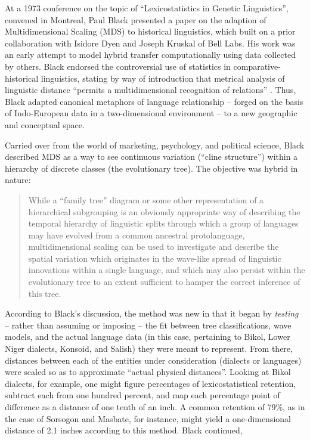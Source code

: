 \documentclass[output=paper]{langscibook}
\begin{document}
At a 1973 conference on the topic of ``Lexicostatistics in Genetic Linguistics'', convened in Montreal, Paul Black presented a paper on the adaption of Multidimensional Scaling (MDS) to historical linguistics, which built on a prior collaboration with Isidore Dyen and Joseph Kruskal of Bell Labs. His work was an early attempt to model hybrid transfer computationally using data collected by others. Black endorsed the controversial use of statistics in comparative-historical linguistics, stating by way of introduction that metrical analysis of linguistic distance ``permits a multidimensional recognition of relations'' \citep[43-92]{Black1973}. Thus, Black adapted canonical metaphors of language relationship – forged on the basis of Indo-European data in a two-dimensional environment – to a new geographic and conceptual space.

Carried over from the world of marketing, psychology, and political science, Black described MDS as a way to see continuous variation (``cline structure'') within a hierarchy of discrete classes (the evolutionary tree).  The objective was hybrid in nature:

\begin{quotation}
While a ``family tree'' diagram or some other representation of a hierarchical subgrouping is an obviously appropriate way of describing the temporal hierarchy of linguistic splits through which a group of languages may have evolved from a common ancestral protolanguage, multidimensional scaling can be used to investigate and describe the spatial variation which originates in the wave-like spread of linguistic innovations within a single language, and which may also persist within the evolutionary tree to an extent sufficient to hamper the correct inference of this tree.  \citep[43]{Black1973}
\end{quotation}

According to Black's discussion, the method was new in that it began by \emph{testing} – rather than assuming or imposing – the fit between tree classifications, wave models, and the actual language data (in this case, pertaining to Bikol, Lower Niger dialects, Konsoid, and Salish) they were meant to represent. From there, distances between each of the entities under consideration (dialects or languages) were scaled so as to approximate ``actual physical distances''. Looking at Bikol dialects, for example, one might figure percentages of lexicostatistical retention, subtract each from one hundred percent, and map each percentage point of difference as a distance of one tenth of an inch. A common retention of 79\%, as in the case of Sorsogon and Masbate, for instance, might yield a one-dimensional distance of 2.1 inches according to this method. Black continued,
\end{document}
